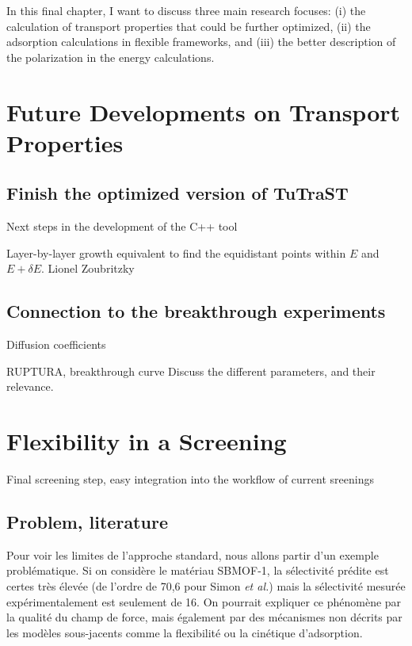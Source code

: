\documentclass[main]{subfiles}
\begin{document}
In this final chapter, I want to discuss three main research focuses: (i) the calculation of transport properties that could be further optimized, (ii) the adsorption calculations in flexible frameworks, and (iii) the better description of the polarization in the energy calculations.

\section{Future Developments on Transport Properties}

\subsection{Finish the optimized version of TuTraST}

Next steps in the development of the C++ tool

Layer-by-layer growth 
equivalent to find the equidistant points within $E$ and $E+\delta E$. 
Lionel Zoubritzky

\subsection{Connection to the breakthrough experiments}

Diffusion coefficients 

RUPTURA, breakthrough curve
Discuss the different parameters, and their relevance.

\section{Flexibility in a Screening}
Final screening step, easy integration into the workflow of current sreenings
\subsection{Problem, literature}


Pour voir les limites de l'approche standard, nous allons partir d'un exemple problématique. Si on considère le matériau SBMOF-1,\autocite{Banerjee_2016} la sélectivité prédite est certes très élevée (de l'ordre de 70,6 pour Simon \emph{et al.}) mais la sélectivité mesurée expérimentalement est seulement de 16. On pourrait expliquer ce phénomène par la qualité du champ de force, mais également par des mécanismes non décrits par les modèles sous-jacents comme la flexibilité ou la cinétique d'adsorption.
\end{document}
